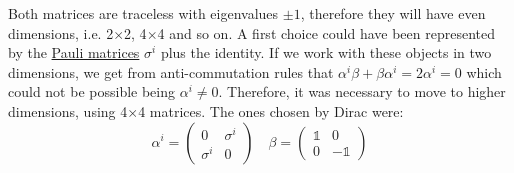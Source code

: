 \documentclass[../main.tex]{subfiles}
\begin{document}
Both matrices are traceless with eigenvalues $\pm1$, therefore they will have even dimensions, i.e. 2$\times$2, 4$\times$4 and so on. A first choice could have been represented by the \href{https://en.wikipedia.org/wiki/Pauli_matrices}{Pauli matrices} $\sigma^i$ plus the identity. If we work with these objects in two dimensions, we get from anti-commutation rules that $\alpha^i\beta+\beta\alpha^i=2\alpha^i=0$ which could not be possible being $\alpha^i\neq0$. Therefore, it was necessary to move to higher dimensions, using 4$\times$4 matrices. The ones chosen by Dirac were:
\[
\alpha^i=\left(\begin{array}{cc}
    0 & \sigma^i \\
    \sigma^i & 0
\end{array}\right)
\quad
\beta=\left(\begin{array}{cc}
    \mathbb{1} & 0 \\
    0 & -\mathbb{1}
\end{array}\right)
\]
\end{document}
